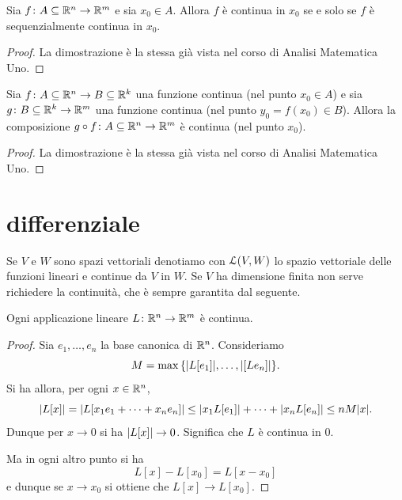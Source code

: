 \begin{theorem}
Sia $f\colon A\subseteq {\mathbb R}^n\to {\mathbb R}^m$ e sia $x_0\in A$.
Allora $f$ è continua in $x_0$ se e solo se $f$ è sequenzialmente 
continua in $x_0$.
\end{theorem}
\begin{proof}
La dimostrazione è la stessa già vista nel corso di Analisi Matematica Uno.
\end{proof}

\begin{theorem}
Sia $f\colon A\subseteq {\mathbb R}^n \to B \subseteq {\mathbb R}^k$ una funzione 
continua (nel punto $x_0\in A$) e sia $g\colon B\subseteq {\mathbb R}^k \to {\mathbb R}^m$ 
una funzione continua (nel punto $y_0=f(x_0)\in B$).
Allora la composizione $g\circ f \colon A \subseteq {\mathbb R}^n \to {\mathbb R}^m$ 
è continua (nel punto $x_0$).
\end{theorem}
%
\begin{proof}
La dimostrazione è la stessa già vista nel corso di Analisi Matematica Uno.
\end{proof}



\section{differenziale}

Se $V$ e $W$ sono spazi vettoriali
denotiamo con $\mathcal L(V,W)$ lo spazio vettoriale delle funzioni lineari 
e continue da $V$ in $W$.
Se $V$ ha dimensione finita non serve richiedere la continuità, 
che è sempre garantita dal seguente.

\begin{theorem}
  \label{th:lineare_continua}
Ogni applicazione lineare $L\colon {\mathbb R}^n\to {\mathbb R}^m$ 
è continua.
\end{theorem}
%
\begin{proof}
Sia $ e_1,\dots,  e_n$ la base canonica di ${\mathbb R}^n$.
Consideriamo
\[
  M = \max{\left\{ {\left|L[ e_1]\right|}, \dots, {\left|[L e_n]\right|} \right\}}.
\]
Si ha allora, per ogni $ x\in {\mathbb R}^n$,
\[
  {\left|L[ x]\right|}
  ={\left|L[x_1  e_1 + \dots + x_n  e_n]\right|}
  \le {\left|x_1 L[ e_1]\right|} + \dots + {\left|x_n L[ e_n]\right|}
  \le nM{\left| x\right|}.
\]
Dunque per $ x \to 0$ si ha ${\left|L[ x]\right|}\to 0$.
Significa che $L$ è continua in $0$.

Ma in ogni altro punto si ha 
\[
  L[ x] - L[ x_0] = L[ x -  x_0] 
\]
e dunque se $ x\to  x_0$ si ottiene che $L[ x]\to L[ x_0]$.
\end{proof}

